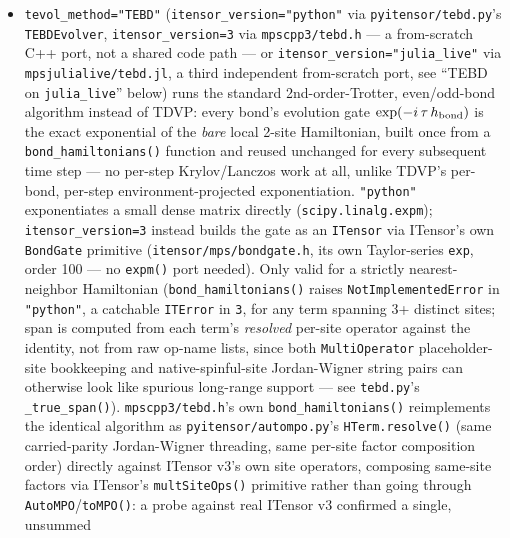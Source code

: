 \documentclass[11pt]{article}
\begin{document}
\begin{itemize}
    minutes at $n=12$, versus under a second for the same computation on
    \texttt{itensor\_version=3}) that couldn't be root-caused in the time
    available --- see git history around \texttt{mpscpp2/TDVP/} if
    picking this up again.
  \item \texttt{tevol\_method="TEBD"} (\texttt{itensor\_version="python"}
    via \texttt{pyitensor/tebd.py}'s \texttt{TEBDEvolver},
    \texttt{itensor\_version=3} via \texttt{mpscpp3/tebd.h} --- a
    from-scratch C++ port, not a shared code path --- or
    \texttt{itensor\_version="julia\_live"} via
    \texttt{mpsjulialive/tebd.jl}, a third independent from-scratch port,
    see ``TEBD on \texttt{julia\_live}'' below) runs the standard
    2nd-order-Trotter, even/odd-bond algorithm instead of TDVP: every
    bond's evolution gate $\exp(-i\,\tau\,h_{\rm bond})$ is the exact
    exponential of the \emph{bare} local 2-site Hamiltonian, built once
    from a \texttt{bond\_hamiltonians()} function and reused unchanged
    for every subsequent time step --- no per-step Krylov/Lanczos work at
    all, unlike TDVP's per-bond, per-step environment-projected
    exponentiation. \texttt{"python"} exponentiates a small dense matrix
    directly (\texttt{scipy.linalg.expm}); \texttt{itensor\_version=3}
    instead builds the gate as an \texttt{ITensor} via ITensor's own
    \texttt{BondGate} primitive (\texttt{itensor/mps/bondgate.h}, its own
    Taylor-series \texttt{exp}, order 100 --- no \texttt{expm()} port
    needed). Only valid for a strictly nearest-neighbor Hamiltonian
    (\texttt{bond\_hamiltonians()} raises \texttt{NotImplementedError} in
    \texttt{"python"}, a catchable \texttt{ITError} in \texttt{3}, for any
    term spanning 3+ distinct sites; span is computed from each term's
    \emph{resolved} per-site operator against the identity, not from raw
    op-name lists, since both \texttt{MultiOperator} placeholder-site
    bookkeeping and native-spinful-site Jordan-Wigner string pairs can
    otherwise look like spurious long-range support --- see
    \texttt{tebd.py}'s \texttt{\_true\_span()}).
    \texttt{mpscpp3/tebd.h}'s own \texttt{bond\_hamiltonians()}
    reimplements the identical algorithm as
    \texttt{pyitensor/autompo.py}'s \texttt{HTerm.resolve()} (same
    carried-parity Jordan-Wigner threading, same per-site factor
    composition order) directly against ITensor v3's own site operators,
    composing same-site factors via ITensor's \texttt{multSiteOps()}
    primitive rather than going through \texttt{AutoMPO}/\texttt{toMPO()}:
    a probe against real ITensor v3 confirmed a single, unsummed

\end{itemize}
\end{document}
